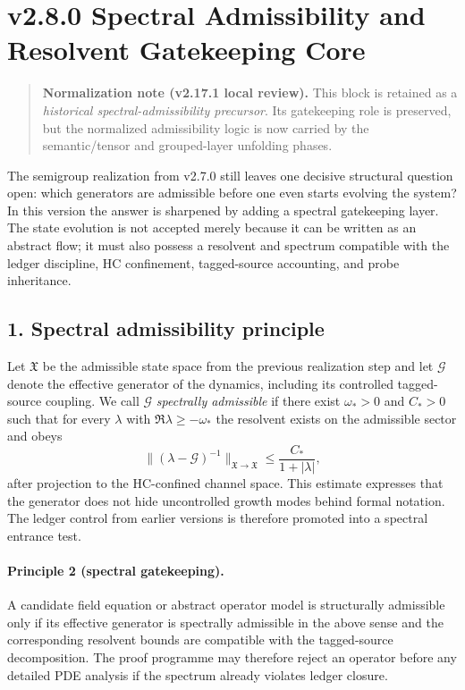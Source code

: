 \section*{v2.8.0 Spectral Admissibility and Resolvent Gatekeeping Core}

\begin{quote}
\textbf{Normalization note (v2.17.1 local review).}
This block is retained as a \emph{historical spectral-admissibility precursor}. Its gatekeeping role is preserved, but the normalized admissibility logic is now carried by the semantic/tensor and grouped-layer unfolding phases.
\end{quote}

The semigroup realization from v2.7.0 still leaves one decisive structural question
open: which generators are admissible before one even starts evolving the system? In
this version the answer is sharpened by adding a spectral gatekeeping layer. The
state evolution is not accepted merely because it can be written as an abstract flow;
it must also possess a resolvent and spectrum compatible with the ledger discipline,
HC confinement, tagged-source accounting, and probe inheritance.

\subsection*{1. Spectral admissibility principle}
Let $\mathfrak X$ be the admissible state space from the previous realization step and
let $\mathcal G$ denote the effective generator of the dynamics, including its
controlled tagged-source coupling. We call $\mathcal G$ \emph{spectrally admissible}
if there exist $\omega_*>0$ and $C_*>0$ such that for every $\lambda$ with
$\Re \lambda\ge -\omega_*$ the resolvent exists on the admissible sector and obeys
\[
\| (\lambda-\mathcal G)^{-1} \|_{\mathfrak X\to\mathfrak X}
\le \frac{C_*}{1+|\lambda|},
\]
after projection to the HC-confined channel space. This estimate expresses that the
generator does not hide uncontrolled growth modes behind formal notation. The ledger
control from earlier versions is therefore promoted into a spectral entrance test.

\paragraph{Principle 2 (spectral gatekeeping).}
A candidate field equation or abstract operator model is structurally admissible only
if its effective generator is spectrally admissible in the above sense and the
corresponding resolvent bounds are compatible with the tagged-source decomposition.
The proof programme may therefore reject an operator before any detailed PDE analysis
if the spectrum already violates ledger closure.

